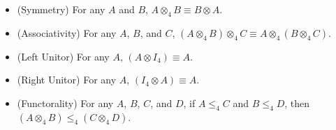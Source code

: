 \begin{lemma}
  \label{lemma:tensor_is_symmetric_monoidal}
  \begin{itemize}
  \item[] (Symmetry) For any $A$ and $B$, $A \otimes_4 B \equiv B \otimes A$.
  \item[] (Associativity) For any $A$, $B$, and $C$, $(A \otimes_4 B) \otimes_4 C \equiv A \otimes_4 (B \otimes_4 C)$.
  \item[] (Left Unitor) For any $A$, $(A \otimes I_4) \equiv A$.
  \item[] (Right Unitor) For any $A$, $(I_4 \otimes A) \equiv A$.
  \item[] (Functorality) For any $A$, $B$, $C$, and $D$, if $A \leq_4 C$ and $B \le_4 D$, then
    $(A \otimes_4 B) \leq_4 (C \otimes_4 D)$.
  \end{itemize}
\end{lemma}

